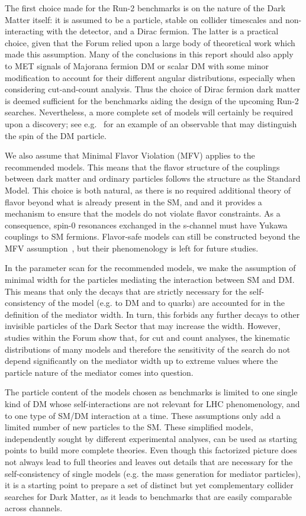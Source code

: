 The first choice made for the Run-2 benchmarks is on the nature of the
Dark Matter itself: it is assumed to be a particle, stable on collider
timescales and non-interacting with the detector, and a Dirac fermion.
The latter is a practical choice, given that the Forum relied upon a
large body of theoretical work which made this assumption. Many of the
conclusions in this report should also apply to MET signals of
Majorana fermion DM or scalar DM with some minor modification to
account for their different angular distributions, especially when
considering cut-and-count analysis. Thus the choice of Dirac fermion
dark matter is deemed sufficient for the benchmarks aiding the design
of the upcoming Run-2 searches. Nevertheless, a more complete set of
models will certainly be required upon a discovery; see
e.g.~\cite{Crivellin:2015wva} for an example of an observable that may
distinguish the spin of the DM particle.

We also assume that Minimal Flavor Violation (MFV) applies to the
recommended models. This means that the flavor structure of the
couplings between dark matter and ordinary particles follows the
structure as the Standard Model. This choice is both natural, as there
is no required additional theory of flavor beyond what is already
present in the SM, and and it provides a mechanism to ensure that the
models do not violate flavor constraints.  As a consequence, spin-0
resonances exchanged in the s-channel must have Yukawa couplings to SM
fermions. Flavor-safe models can still be constructed beyond the MFV
assumption~\cite{Agrawal:2014aoa}, but their phenomenology is left for
future studies.

In the parameter scan for the recommended models, we make the
assumption of minimal width for the particles mediating the
interaction between SM and DM.  This means that only the decays that
are strictly necessary for the self-consistency of the model (e.g.  to
DM and to quarks) are accounted for in the definition of the mediator
width. In turn, this forbids any further decays to other invisible
particles of the Dark Sector that may increase the width. However,
studies within the Forum show that, for cut and count analyses, the
kinematic distributions of many models and therefore the sensitivity
of the search do not depend significantly on the mediator width up to
extreme values where the particle nature of the mediator comes into
question.

The particle content of the models chosen as benchmarks is limited to
one single kind of DM whose self-interactions are not relevant for LHC
phenomenology, and to one type of SM/DM interaction at a time. These
assumptions only add a limited number of new particles to the
SM. These simplified models, independently sought by different
experimental analyses, can be used as starting points to build more
complete theories. Even though this factorized picture does not always
lead to full theories and leaves out details that are necessary for
the self-consistency of single models (e.g. the mass generation for
mediator particles), it is a starting point to prepare a set of
distinct but yet complementary collider searches for Dark Matter, as
it leads to benchmarks that are easily comparable across channels.
